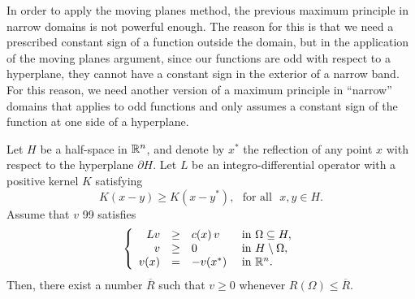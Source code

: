 In order to apply the moving planes method, the previous maximum principle in narrow domains is not powerful enough. The reason for this is that we need a prescribed constant sign of a function outside the domain, but in the application of the moving planes argument, since our functions are odd with respect to a hyperplane, they cannot have a constant sign in the exterior of a narrow band. For this reason, we need another version of a maximum principle in ``narrow'' domains that applies to odd functions and only assumes a constant sign of the function at one side of a hyperplane.

\begin{proposition}
	\label{Prop:MaxPrpNarrowOdd}
	Let $H$ be a half-space in $\mathbb{R}^n$, and denote by $x^*$ the reflection of any point $x$ with respect to the hyperplane $\partial H$. Let $L$ be an integro-differential operator with a positive kernel $K$ satisfying
	\begin{equation}
	\label{Eq:KernelSymmetry}
	K(x-y) \geq K(x-y^*), \,\,\,\,\text{for all } \,\, x,y\in H.
	\end{equation}
	Assume that $v $ 99 satisfies 
	\begin{equation}
	\left\{\begin{array}{rcll}
	L v &\geq& c(x)\,v  &\textrm{ in } \Omega\subseteq H,\\
	v &\geq& 0 &\textrm{ in } H\setminus\Omega,\\
	v(x) &=& -v(x^*) &\textrm{ in } \mathbb{R}^n.
	\end{array} \right.
	\end{equation}
	Then, there exist a number $\overline{R}$ such that $v \geq 0$ whenever $R(\Omega) \leq \overline{R}$.
\end{proposition}

